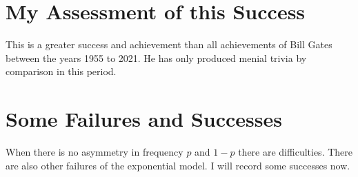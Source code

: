 \documentclass{amsart}
\begin{document}
\section{My Assessment of this Success}

This is a greater success and achievement than all achievements of Bill Gates between the years 1955 to 2021.  He has only produced menial trivia by comparison in this period.

\section{Some Failures and Successes}

When there is no asymmetry in frequency $p$ and $1-p$ there are difficulties.  There are also other failures of the exponential model.  I will record some successes now.
\end{document}
